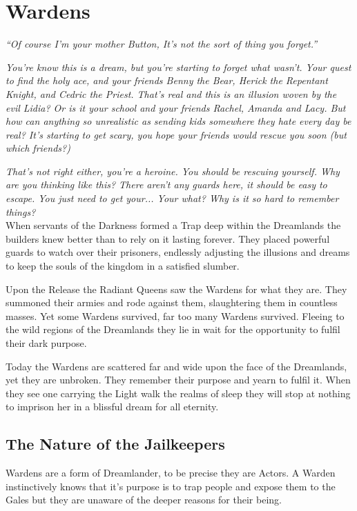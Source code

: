\section*{Wardens}

\textit{\textquotedblleft Of course I'm your mother Button, It's not the sort of thing you forget.\textquotedblright}

\textit{You're know this is a dream, but you're starting to forget what wasn't. Your quest to find the holy ace, and your friends Benny the Bear, Herick the Repentant Knight, and Cedric the Priest. That's real and this is an illusion woven by the evil Lidia? Or is it your school and your friends Rachel, Amanda and Lacy. But how can anything so unrealistic as sending kids somewhere they hate every day be real? It's starting to get scary, you hope your friends would rescue you soon (but which friends?)}

\textit{That's not right either, you're a heroine. You should be rescuing yourself. Why are you thinking like this? There aren't any guards here, it should be easy to escape. You just need to get your... Your what? Why is it so hard to remember things?}\\

\noindent When servants of the Darkness formed a Trap deep within the Dreamlands the builders knew better than to rely on it lasting forever. They placed powerful guards to watch over their prisoners, endlessly adjusting the illusions and dreams to keep the souls of the kingdom in a satisfied slumber.

Upon the Release the Radiant Queens saw the Wardens for what they are. They summoned their armies and rode against them, slaughtering them in countless masses. Yet some Wardens survived, far too many Wardens survived. Fleeing to the wild regions of the Dreamlands they lie in wait for the opportunity to fulfil their dark purpose.

Today the Wardens are scattered far and wide upon the face of the Dreamlands, yet they are unbroken. They remember their purpose and yearn to fulfil it. When they see one carrying the Light walk the realms of sleep they will stop at nothing to imprison her in a blissful dream for all eternity. 

\subsection*{The Nature of the Jailkeepers}
Wardens are a form of Dreamlander, to be precise they are Actors. A Warden instinctively knows that it's purpose is to trap people and expose them to the Gales but they are unaware of the deeper reasons for their being.

